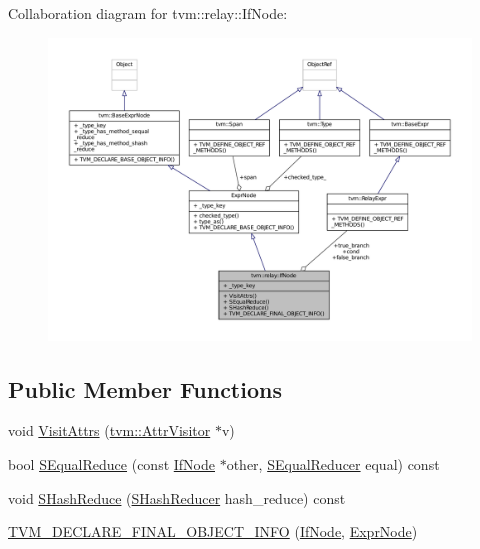 Collaboration diagram for tvm\+:\+:relay\+:\+:If\+Node\+:
\nopagebreak
\begin{figure}[H]
\begin{center}
\leavevmode
\includegraphics[width=350pt]{classtvm_1_1relay_1_1IfNode__coll__graph}
\end{center}
\end{figure}
\subsection*{Public Member Functions}
\begin{DoxyCompactItemize}
\item 
void \hyperlink{classtvm_1_1relay_1_1IfNode_abfa08f6738f227ba03e36c56108260ff}{Visit\+Attrs} (\hyperlink{classtvm_1_1AttrVisitor}{tvm\+::\+Attr\+Visitor} $\ast$v)
\item 
bool \hyperlink{classtvm_1_1relay_1_1IfNode_a2038fd2b4e6581238e4993ed75b0e4f8}{S\+Equal\+Reduce} (const \hyperlink{classtvm_1_1relay_1_1IfNode}{If\+Node} $\ast$other, \hyperlink{classtvm_1_1SEqualReducer}{S\+Equal\+Reducer} equal) const 
\item 
void \hyperlink{classtvm_1_1relay_1_1IfNode_ad79a6a99b3fe5f40ff8cb5e236a6f84b}{S\+Hash\+Reduce} (\hyperlink{classtvm_1_1SHashReducer}{S\+Hash\+Reducer} hash\+\_\+reduce) const 
\item 
\hyperlink{classtvm_1_1relay_1_1IfNode_a1629922c27b772bb5b328b0c9fe4d687}{T\+V\+M\+\_\+\+D\+E\+C\+L\+A\+R\+E\+\_\+\+F\+I\+N\+A\+L\+\_\+\+O\+B\+J\+E\+C\+T\+\_\+\+I\+N\+FO} (\hyperlink{classtvm_1_1relay_1_1IfNode}{If\+Node}, \hyperlink{namespacetvm_1_1relay_a387f18e050d016c52ea6c4781e7cff6c}{Expr\+Node})
\end{DoxyCompactItemize}
